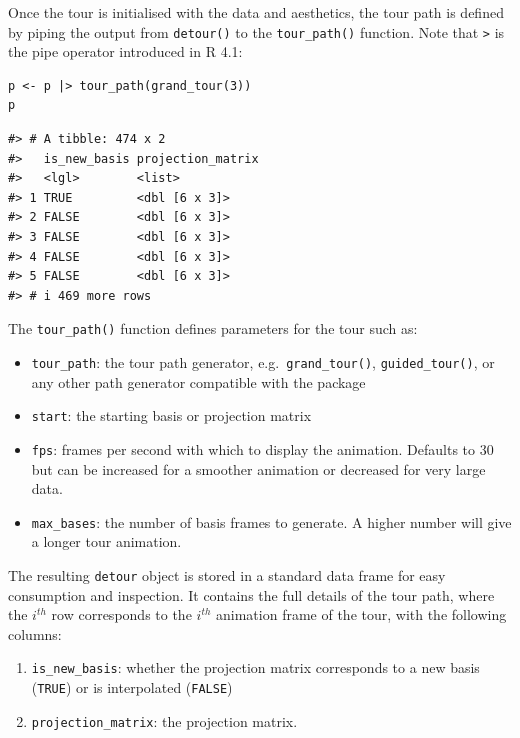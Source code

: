 Once the tour is initialised with the data and aesthetics, the tour path is defined by piping the output from \texttt{detour()} to the \texttt{tour\_path()} function. Note that \texttt{\textbar{}\textgreater{}} is the pipe operator introduced in R 4.1:

\pagebreak

\begin{verbatim}
p <- p |> tour_path(grand_tour(3))
p
\end{verbatim}

\begin{verbatim}
#> # A tibble: 474 x 2
#>   is_new_basis projection_matrix
#>   <lgl>        <list>           
#> 1 TRUE         <dbl [6 x 3]>    
#> 2 FALSE        <dbl [6 x 3]>    
#> 3 FALSE        <dbl [6 x 3]>    
#> 4 FALSE        <dbl [6 x 3]>    
#> 5 FALSE        <dbl [6 x 3]>    
#> # i 469 more rows
\end{verbatim}

The \texttt{tour\_path()} function defines parameters for the tour such as:

\begin{itemize}
\tightlist
\item
  \texttt{tour\_path}: the tour path generator, e.g.~\texttt{grand\_tour()}, \texttt{guided\_tour()}, or any other path generator compatible with the  package
\item
  \texttt{start}: the starting basis or projection matrix
\item
  \texttt{fps}: frames per second with which to display the animation. Defaults to 30 but can be increased for a smoother animation or decreased for very large data.
\item
  \texttt{max\_bases}: the number of basis frames to generate. A higher number will give a longer tour animation.
\end{itemize}

The resulting \texttt{detour} object is stored in a standard data frame for easy consumption and inspection. It contains the full details of the tour path, where the \(i^{th}\) row corresponds to the \(i^{th}\) animation frame of the tour, with the following columns:

\begin{enumerate}
\def\labelenumi{\arabic{enumi}.}
\tightlist
\item
  \texttt{is\_new\_basis}: whether the projection matrix corresponds to a new basis (\texttt{TRUE}) or is interpolated (\texttt{FALSE})
\item
  \texttt{projection\_matrix}: the projection matrix.
\end{enumerate}

